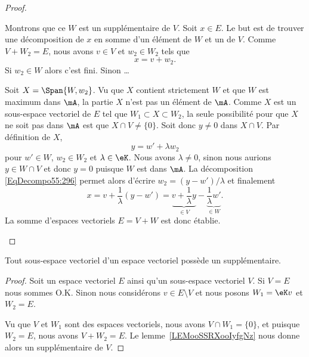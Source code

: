 \begin{proof}
\begin{subproof}
		\spitem[Supplémentaire]
		Montrons que ce \( W\) est un supplémentaire de \( V\). Soit \( x\in E\). Le but est de trouver une décomposition de \( x\) en somme d'un élément de \( W\) et un de \( V\). Comme \( V+W_2=E\), nous avons \( v\in V\) et \( w_2\in W_2\) tels que
		\begin{equation}
			x=v+w_2.
		\end{equation}
		Si \( w_2\in W\) alors c'est fini. Sinon \ldots

		Soit \( X=\Span\{ W,w_2 \}\). Vu que \( X\) contient strictement \( W\) et que \( W\) est maximum dans \( \mA\), la partie \( X\) n'est pas un élément de \( \mA\). Comme \( X\) est un sous-espace vectoriel de \( E\) tel que \( W_1\subset X\subset W_2\), la seule possibilité pour que \( X\) ne soit pas dans \( \mA\) est que \( X\cap V\neq \{ 0 \}\). Soit donc \( y\neq 0\) dans \( X\cap V\). Par définition de \( X\),
		\begin{equation}      \label{EqDecompo55:296}
			y=w'+\lambda w_2
		\end{equation}
		pour \( w'\in W\), \( w_2\in W_2\) et \( \lambda\in \eK\). Nous avons \( \lambda\neq 0\), sinon nous aurions \( y\in W\cap V \) et donc \(y = 0 \) puisque \( W \) est dans \( \mA \). La décomposition \eqref{EqDecompo55:296} permet alors d'écrire \( w_2=(y-w')/\lambda\) et finalement
		\begin{equation}
			x=v+\frac{1}{ \lambda }(y-w')=\underbrace{v+\frac{1}{ \lambda }y}_{\in V}-\underbrace{\frac{1}{ \lambda }w'}_{\in W}.
		\end{equation}
		La somme d'espaces vectoriels \( E=V+W\) est donc établie.
	\end{subproof}
\end{proof}

\begin{corollary}
	Tout sous-espace vectoriel d'un espace vectoriel possède un supplémentaire.
\end{corollary}

\begin{proof}
	Soit un espace vectoriel \( E\) ainsi qu'un sous-espace vectoriel \( V\). Si \( V=E\) nous sommes O.K. Sinon nous considérons \( v\in E\setminus V\) et nous posons \( W_1=\eK v\) et \( W_2=E\).

	Vu que \( V\) et \( W_1\) sont des espaces vectoriels, nous avons \( V\cap W_1=\{ 0 \}\), et puisque \( W_2=E\), nous avons \( V+W_2=E\). Le lemme~\ref{LEMooSSRXooIyfgNz} nous donne alors un supplémentaire de \( V\).
\end{proof}

